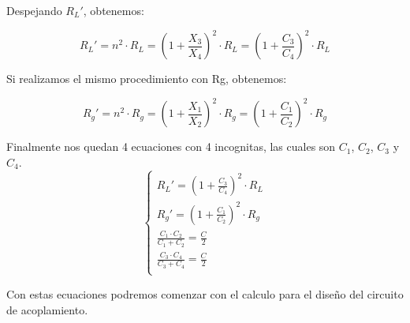 Despejando $R_L'$, obtenemos:

\begin{equation}
    R_L' = n^2 \cdot R_L = (1 + \frac{X_3}{X_4})^2 \cdot R_L = (1 + \frac{C_3}{C_4})^2 \cdot R_L
\end{equation}

Si realizamos el mismo procedimiento con Rg, obtenemos:

\begin{equation}
    R_g' = n^2 \cdot R_g = (1 + \frac{X_1}{X_2})^2 \cdot R_g = (1 + \frac{C_1}{C_2})^2 \cdot R_g
\end{equation}

Finalmente nos quedan 4 ecuaciones con 4 incognitas, las cuales son $C_1$, $C_2$, $C_3$ y $C_4$.
\begin{equation}
    \begin{cases}
        R_L' = (1 + \frac{C_3}{C_4})^2 \cdot R_L \\
        R_g' = (1 + \frac{C_1}{C_2})^2 \cdot R_g \\
        \frac{ C_1 \cdot C_2}{C_1 + C_2} = \frac{C}{2} \\
        \frac{ C_3 \cdot C_4}{C_3 + C_4} = \frac{C}{2} \\
    \end{cases}
\end{equation}

Con estas ecuaciones podremos comenzar con el calculo para el diseño del circuito de acoplamiento.


